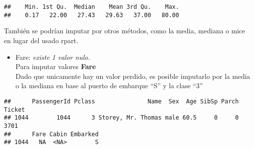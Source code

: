 \documentclass[]{article}
\newenvironment{Shaded}{\begin{snugshade}}{\end{snugshade}}
\newcommand{\KeywordTok}[1]{\textcolor[rgb]{0.13,0.29,0.53}{\textbf{#1}}}
\newcommand{\DataTypeTok}[1]{\textcolor[rgb]{0.13,0.29,0.53}{#1}}
\newcommand{\StringTok}[1]{\textcolor[rgb]{0.31,0.60,0.02}{#1}}
\newcommand{\CommentTok}[1]{\textcolor[rgb]{0.56,0.35,0.01}{\textit{#1}}}
\newcommand{\OperatorTok}[1]{\textcolor[rgb]{0.81,0.36,0.00}{\textbf{#1}}}
\newcommand{\NormalTok}[1]{#1}
\providecommand{\tightlist}{%
  \setlength{\itemsep}{0pt}\setlength{\parskip}{0pt}}
\begin{document}
\begin{Shaded}
\end{Shaded}

\begin{verbatim}
##    Min. 1st Qu.  Median    Mean 3rd Qu.    Max. 
##    0.17   22.00   27.43   29.63   37.00   80.00
\end{verbatim}

También se podrían imputar por otros métodos, como la media, mediana o
mice en lugar del usado rpart.

\begin{itemize}
\tightlist
\item
  Fare: \emph{existe 1 valor nulo.}\\
  Para imputar valores \textbf{Fare}\\
  Dado que unicamente hay un valor perdido, es posible imputarlo por la
  media o la mediana en base al puerto de embarque ``S'' y la clase
  ``3''
\end{itemize}

\begin{Shaded}
\end{Shaded}

\begin{verbatim}
##      PassengerId Pclass               Name  Sex  Age SibSp Parch Ticket
## 1044        1044      3 Storey, Mr. Thomas male 60.5     0     0   3701
##      Fare Cabin Embarked
## 1044   NA  <NA>        S
\end{verbatim}
\end{document}
